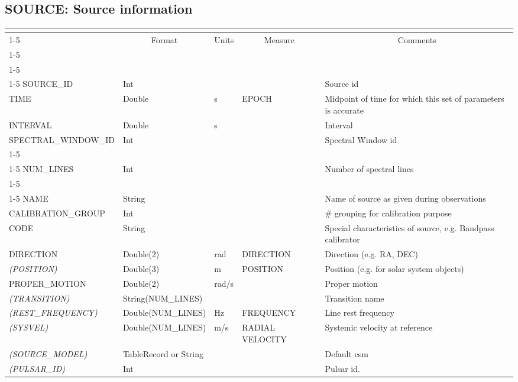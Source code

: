 \documentclass{article}
\newcommand{\defline}[1]{\cline{1-5}
\multicolumn{5}{|l|}{#1} \\
\cline{1-5}}
\newcommand{\definetable}[3][]
{
  \vfill\newpage
  \subsection{#2}
  \label{tbl:#1}
  \vspace{0.15in}
  \small
  \begin{tabular}{|l|p{1.25in}|l|p{.9in}|p{1.4in}|}
  \hline
  \multicolumn{5}{|c|}{\bf #1}\\
  \cline{1-5}
  \multicolumn{1}{|c|}{Name}&\multicolumn{1}{|c|}{Format}&
  \multicolumn{1}{|c|}{Units}&\multicolumn{1}{|c|}{Measure}&
  \multicolumn{1}{|c|}{Comments}\\
  \cline{1-5}
  #3
  \hline
  \end{tabular}
}
\begin{document}
\definetable{SOURCE: Source information}{
\defline{\bf Columns}
\defline{\em Key}
SOURCE\_ID &      Int &    &      & Source id\\
TIME &   Double & s  &   EPOCH  & Midpoint of time for which this set of parameters is accurate\\
INTERVAL &       Double & s &               & Interval\\
SPECTRAL\_WINDOW\_ID &   Int &    &      & Spectral Window id\\
\defline{\em Data description}
NUM\_LINES &  Int & & & Number of spectral lines\\
\defline{\em Data}
NAME &       String &    &      & Name of source as given during observations\\
CALIBRATION\_GROUP &      Int &    &      & \# grouping for calibration purpose\\
CODE &       String &    &      & Special characteristics of source, e.g. Bandpass calibrator\\
DIRECTION &       Double(2) &  rad  &    DIRECTION &        Direction (e.g. RA, DEC) \\
{\it (POSITION)}  & Double(3) &   m  & POSITION & Position (e.g. for solar system objects) \\
PROPER\_MOTION &  Double(2) &  rad/s & &  Proper motion \\
{\it (TRANSITION)} & String(NUM\_LINES) & & & Transition name\\
{\it (REST\_FREQUENCY)} & Double(NUM\_LINES) & Hz & FREQUENCY & Line rest frequency\\
{\it (SYSVEL)}   & Double(NUM\_LINES)  &  m/s  & RADIAL VELOCITY & Systemic velocity at reference \\
{\it (SOURCE\_MODEL)} & TableRecord or String & & & Default csm \\
{\it (PULSAR\_ID)} & Int & & & Pulsar id. \\
}
\end{document}
